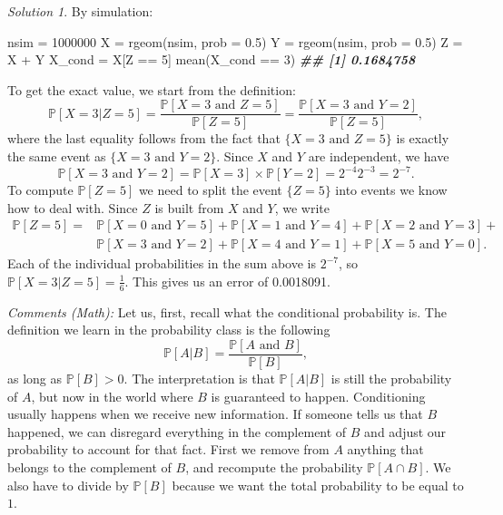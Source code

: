 \documentclass[
]{book}
\newenvironment{Shaded}{\begin{snugshade}}{\end{snugshade}}
\newcommand{\AttributeTok}[1]{\textcolor[rgb]{0.77,0.63,0.00}{#1}}
\newcommand{\DecValTok}[1]{\textcolor[rgb]{0.00,0.00,0.81}{#1}}
\newcommand{\DocumentationTok}[1]{\textcolor[rgb]{0.56,0.35,0.01}{\textbf{\textit{#1}}}}
\newcommand{\FloatTok}[1]{\textcolor[rgb]{0.00,0.00,0.81}{#1}}
\newcommand{\FunctionTok}[1]{\textcolor[rgb]{0.00,0.00,0.00}{#1}}
\newcommand{\NormalTok}[1]{#1}
\newcommand{\OtherTok}[1]{\textcolor[rgb]{0.56,0.35,0.01}{#1}}
\newcommand{\SpecialCharTok}[1]{\textcolor[rgb]{0.00,0.00,0.00}{#1}}
\theoremstyle{definition}
\theoremstyle{definition}
\theoremstyle{definition}
\theoremstyle{definition}
\theoremstyle{remark}
\newtheorem*{solution}{Solution}
\begin{document}
\begin{solution}
By simulation:

\begin{Shaded}
\begin{Highlighting}[]
\NormalTok{nsim }\OtherTok{=} \DecValTok{1000000}
\NormalTok{X }\OtherTok{=} \FunctionTok{rgeom}\NormalTok{(nsim, }\AttributeTok{prob =} \FloatTok{0.5}\NormalTok{)}
\NormalTok{Y }\OtherTok{=} \FunctionTok{rgeom}\NormalTok{(nsim, }\AttributeTok{prob =} \FloatTok{0.5}\NormalTok{)}
\NormalTok{Z }\OtherTok{=}\NormalTok{ X }\SpecialCharTok{+}\NormalTok{ Y}
\NormalTok{X\_cond }\OtherTok{=}\NormalTok{ X[Z }\SpecialCharTok{==} \DecValTok{5}\NormalTok{]}
\FunctionTok{mean}\NormalTok{(X\_cond  }\SpecialCharTok{==} \DecValTok{3}\NormalTok{) }
\DocumentationTok{\#\# [1] 0.1684758}
\end{Highlighting}
\end{Shaded}

To get the exact value, we start from the definition:
\[ {\mathbb{P}}[ X = 3 | Z= 5 ] = \frac{{\mathbb{P}}[ X=3 \text{ and }Z=5]}{{\mathbb{P}}[Z=5]} = \frac{{\mathbb{P}}[X=3 \text{ and }Y = 2]}{{\mathbb{P}}[Z=5]}, \]
where the last equality follows from the fact that \(\{ X=3 \text{ and } Z=5 \}\) is exactly the same event as \(\{ X = 3 \text{ and } Y=2\}\).
Since \(X\) and \(Y\) are independent, we have
\[{\mathbb{P}}[ X=3 \text{ and }Y=2 ] = {\mathbb{P}}[X=3] \times {\mathbb{P}}[ Y=2] = 2^{-4} 2^{-3} = 2^{-7}.\]
To compute \({\mathbb{P}}[ Z = 5]\) we need to split the event \(\{ Z = 5 \}\) into events we know how to deal with. Since \(Z\) is built from \(X\) and \(Y\), we write
\[ \begin{align} {\mathbb{P}}[ Z = 5 ] = &{\mathbb{P}}[X=0 \text{ and }Y=5]+ {\mathbb{P}}[ X=1 \text{ and }Y=4] + {\mathbb{P}}[ X=2 \text{ and }Y=3] + \\
&  {\mathbb{P}}[ X=3 \text{ and }Y=2] + {\mathbb{P}}[ X=4 \text{ and }Y=1] + {\mathbb{P}}[ X = 5 \text{ and }Y=0]. \end{align}\]
Each of the individual probabilities in the sum above is \(2^{-7}\), so \({\mathbb{P}}[ X = 3 | Z = 5] = \frac{1}{6}\).
This gives us an error of 0.0018091.

\emph{Comments (Math):} Let us, first, recall what the conditional probability is.
The definition we learn in the probability class is the following \[ {\mathbb{P}}[A | B]
= \frac{{\mathbb{P}}[A \text{ and }B]}{{\mathbb{P}}[B]},\] as long as \({\mathbb{P}}[B]>0\). The interpretation is
that \({\mathbb{P}}[A|B]\) is still the probability of \(A\), but now in the world where \(B\)
is guaranteed to happen. Conditioning usually happens when we receive new
information. If someone tells us that \(B\) happened, we can disregard everything
in the complement of \(B\) and adjust our probability to account for that fact.
First we remove from \(A\) anything that belongs to the complement of \(B\), and
recompute the probability \({\mathbb{P}}[A \cap B]\). We also have to divide by \({\mathbb{P}}[B]\)
because we want the total probability to be equal to \(1\).


\end{solution}
\end{document}
